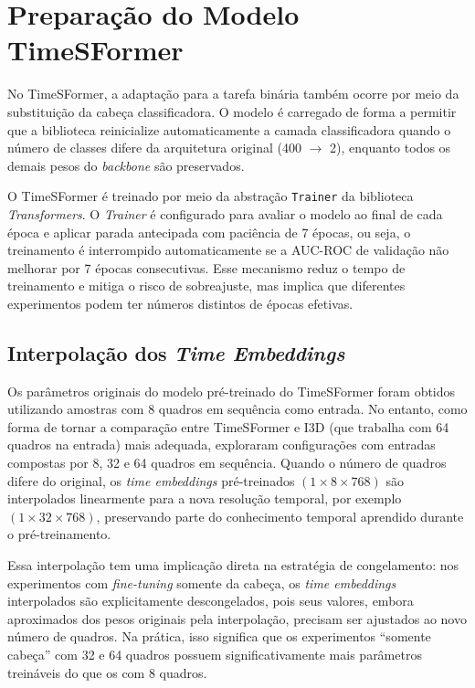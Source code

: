 \documentclass[12pt, %
openright, 
oneside, %
a4paper,    %
brazil]{facom-ufu-abntex2}
\begin{document}
\section[Preparação do Modelo TimeSFormer]{Preparação do Modelo TimeSFormer}

No TimeSFormer, a adaptação para a tarefa binária também ocorre por meio da substituição da cabeça classificadora. O modelo é carregado de forma a permitir que a biblioteca reinicialize automaticamente a camada classificadora quando o número de classes difere da arquitetura original (400 $\to$ 2), enquanto todos os demais pesos do \textit{backbone} são preservados.

O TimeSFormer é treinado por meio da abstração \texttt{Trainer} da biblioteca \textit{Transformers}. O \textit{Trainer} é configurado para avaliar o modelo ao final de cada época e aplicar parada antecipada com paciência de 7 épocas, ou seja, o treinamento é interrompido automaticamente se a AUC-ROC de validação não melhorar por 7 épocas consecutivas. Esse mecanismo reduz o tempo de treinamento e mitiga o risco de sobreajuste, mas implica que diferentes experimentos podem ter números distintos de épocas efetivas.

\subsection[Interpolação dos \textit{Time Embeddings}]{Interpolação dos \textit{Time Embeddings}}

Os parâmetros originais do modelo pré-treinado do TimeSFormer foram obtidos utilizando amostras com 8 quadros em sequência como entrada. No entanto, como forma de tornar a comparação entre TimeSFormer e I3D (que trabalha com 64 quadros na entrada) mais adequada, exploraram configurações com entradas compostas por 8, 32 e 64 quadros em sequência. Quando o número de quadros difere do original, os \textit{time embeddings} pré-treinados $(1 \times 8 \times 768)$ são interpolados linearmente para a nova
resolução temporal, por exemplo $(1 \times 32 \times 768)$, preservando parte do conhecimento temporal aprendido durante o pré-treinamento.

Essa interpolação tem uma implicação direta na estratégia de congelamento: nos experimentos com \textit{fine-tuning} somente da cabeça, os \textit{time embeddings} interpolados são explicitamente descongelados, pois seus valores, embora aproximados dos pesos originais pela interpolação, precisam ser ajustados ao novo número de quadros.
Na prática, isso significa que os experimentos ``somente cabeça'' com 32 e 64 quadros possuem significativamente mais parâmetros treináveis do que os com 8 quadros.
\end{document}

